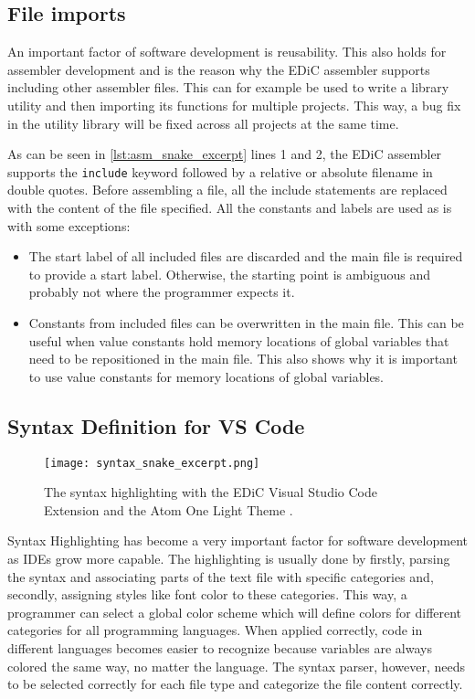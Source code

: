 \subsection{File imports}\label{sec:imports}
An important factor of software development is reusability.
This also holds for assembler development and is the reason why the \gls{EDiC} assembler supports including other assembler files.
This can for example be used to write a library utility and then importing its functions for multiple projects.
This way, a bug fix in the utility library will be fixed across all projects at the same time.

As can be seen in \cref{lst:asm_snake_excerpt} lines 1 and 2, the \gls{EDiC} assembler supports the \texttt{include} keyword followed by a relative or absolute filename in double quotes.
Before assembling a file, all the include statements are replaced with the content of the file specified.
All the constants and labels are used as is with some exceptions:
\begin{itemize}
  \item The start label of all included files are discarded and the main file is required to provide a start label.
        Otherwise, the starting point is ambiguous and probably not where the programmer expects it.
  \item Constants from included files can be overwritten in the main file.
        This can be useful when value constants hold memory locations of global variables that need to be repositioned in the main file.
        This also shows why it is important to use value constants for memory locations of global variables.
\end{itemize}


\subsection{Syntax Definition for VS Code}
\begin{figure}[t]
  \centering
  \texttt{[image: syntax\_snake\_excerpt.png]}
  \caption{The syntax highlighting with the \gls{EDiC} Visual Studio Code Extension and the Atom One Light Theme \cite{VSCodeLight}.}
  \label{fig:SyntaxEDiC}
\end{figure}
Syntax Highlighting has become a very important factor for software development as \glspl{IDE} grow more capable.
The highlighting is usually done by firstly, parsing the syntax and associating parts of the text file with specific categories and, secondly, assigning styles like font color to these categories.
This way, a programmer can select a global color scheme which will define colors for different categories for all programming languages.
When applied correctly, code in different languages becomes easier to recognize because variables are always colored the same way, no matter the language.
The syntax parser, however, needs to be selected correctly for each file type and categorize the file content correctly.

